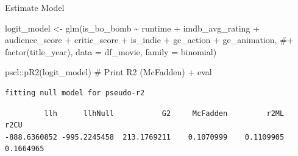 \documentclass[
  10pt,
  ignorenonframetext,
]{beamer}
\newenvironment{Shaded}{\begin{snugshade}}{\end{snugshade}}
\newcommand{\AttributeTok}[1]{\textcolor[rgb]{0.40,0.45,0.13}{#1}}
\newcommand{\CommentTok}[1]{\textcolor[rgb]{0.37,0.37,0.37}{#1}}
\newcommand{\FunctionTok}[1]{\textcolor[rgb]{0.28,0.35,0.67}{#1}}
\newcommand{\NormalTok}[1]{\textcolor[rgb]{0.00,0.23,0.31}{#1}}
\newcommand{\OtherTok}[1]{\textcolor[rgb]{0.00,0.23,0.31}{#1}}
\newcommand{\SpecialCharTok}[1]{\textcolor[rgb]{0.37,0.37,0.37}{#1}}
\begin{document}
\begin{frame}[fragile]{Estimate Model}
\label{estimate-model}
\scriptsize

\begin{Shaded}
\begin{Highlighting}[]
\NormalTok{logit\_model }\OtherTok{\textless{}{-}} \FunctionTok{glm}\NormalTok{(is\_bo\_bomb }\SpecialCharTok{\textasciitilde{}}\NormalTok{  runtime }\SpecialCharTok{+}\NormalTok{ imdb\_avg\_rating }\SpecialCharTok{+} 
\NormalTok{                     audience\_score }\SpecialCharTok{+}\NormalTok{ critic\_score }\SpecialCharTok{+}\NormalTok{ is\_indie }\SpecialCharTok{+} 
\NormalTok{                     ge\_action }\SpecialCharTok{+}\NormalTok{ ge\_animation, }\CommentTok{\#+ factor(title\_year),}
                   \AttributeTok{data =}\NormalTok{ df\_movie,}
                   \AttributeTok{family =}\NormalTok{ binomial)}

\NormalTok{pscl}\SpecialCharTok{::}\FunctionTok{pR2}\NormalTok{(logit\_model) }\CommentTok{\# Print R2 (McFadden) + eval}
\end{Highlighting}
\end{Shaded}

\begin{verbatim}
fitting null model for pseudo-r2
\end{verbatim}

\begin{verbatim}
         llh      llhNull           G2     McFadden         r2ML         r2CU 
-888.6360852 -995.2245458  213.1769211    0.1070999    0.1109905    0.1664965 
\end{verbatim}
\end{frame}
\end{document}
